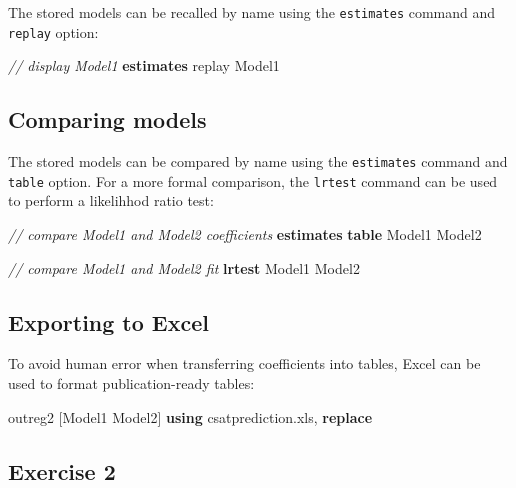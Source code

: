 \documentclass[
]{book}
\newenvironment{Shaded}{\begin{snugshade}}{\end{snugshade}}
\newcommand{\CommentTok}[1]{\textcolor[rgb]{0.56,0.35,0.01}{\textit{#1}}}
\newcommand{\FunctionTok}[1]{\textcolor[rgb]{0.00,0.00,0.00}{#1}}
\newcommand{\KeywordTok}[1]{\textcolor[rgb]{0.13,0.29,0.53}{\textbf{#1}}}
\newcommand{\NormalTok}[1]{#1}
\begin{document}
The stored models can be recalled by name using the \texttt{estimates} command and \texttt{replay} option:

\begin{Shaded}
\begin{Highlighting}[]
\CommentTok{// display Model1}
\KeywordTok{estimates} \FunctionTok{replay}\NormalTok{ Model1}
\end{Highlighting}
\end{Shaded}

\hypertarget{comparing-models-1}{%
\subsection{Comparing models}\label{comparing-models-1}}

The stored models can be compared by name using the \texttt{estimates} command and \texttt{table} option. For a more formal comparison, the \texttt{lrtest} command can be used to perform a likelihhod ratio test:

\begin{Shaded}
\begin{Highlighting}[]
\CommentTok{// compare Model1 and Model2 coefficients}
\KeywordTok{estimates} \KeywordTok{table}\NormalTok{ Model1 Model2}

\CommentTok{// compare Model1 and Model2 fit }
\KeywordTok{lrtest}\NormalTok{ Model1 Model2 }
\end{Highlighting}
\end{Shaded}

\hypertarget{exporting-to-excel}{%
\subsection{Exporting to Excel}\label{exporting-to-excel}}

To avoid human error when transferring coefficients into tables, Excel can be used to format publication-ready tables:

\begin{Shaded}
\begin{Highlighting}[]
\NormalTok{outreg2 [Model1 Model2] }\KeywordTok{using}\NormalTok{ csatprediction.xls, }\KeywordTok{replace}
\end{Highlighting}
\end{Shaded}

\hypertarget{exercise-2-6}{%
\subsection{Exercise 2}\label{exercise-2-6}}
\end{document}
